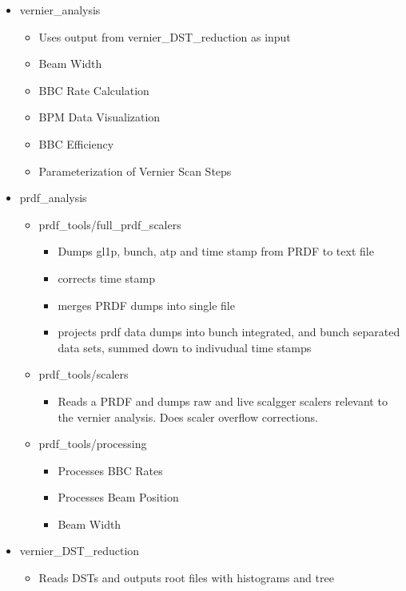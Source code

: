 \begin{itemize}
\item vernier\_analysis
  \begin{itemize}
    \item Uses output from vernier\_DST\_reduction as input
    \item Beam Width
    \item BBC Rate Calculation
    \item BPM Data Visualization
    \item BBC Efficiency
    \item Parameterization of Vernier Scan Steps
  \end{itemize}
\item prdf\_analysis
  \begin{itemize}
    \item prdf\_tools/full\_prdf\_scalers
      \begin{itemize}
        \item Dumps gl1p, bunch, atp and time stamp from PRDF to text file
	\item corrects time stamp
	\item merges PRDF dumps into single file
	\item projects prdf data dumps into bunch integrated, and bunch separated data
	sets, summed down to indivudual time stamps
      \end{itemize}
    \item prdf\_tools/scalers
      \begin{itemize}
        \item Reads a PRDF and dumps raw and live scalgger scalers relevant to the vernier
	analysis. Does scaler overflow corrections.
      \end{itemize}
    \item prdf\_tools/processing
      \begin{itemize}
        \item Processes BBC Rates
	\item Processes Beam Position
	\item Beam Width
      \end{itemize}
  \end{itemize}
\item vernier\_DST\_reduction
  \begin{itemize}
    \item Reads DSTs and outputs root files with histograms and tree
   \end{itemize}
\end{itemize}

